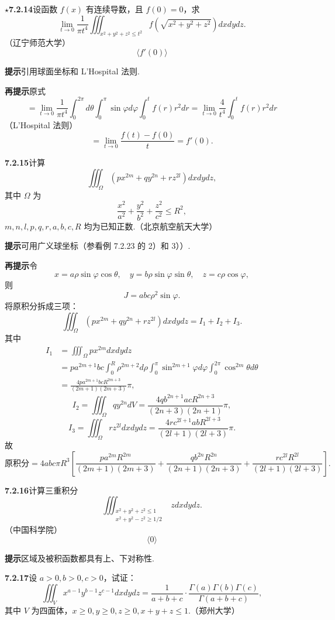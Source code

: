 \documentclass[UTF8,12pt,a4paper,fontset=fandol]{ctexart}
\begin{document}
\noindent\textbf{$\star$7.2.14}\quad 设函数 $f(x)$ 有连续导数，且 $f(0)=0$，求
\[
\lim_{t\to0}\frac1{\pi t^4}
\iiint_{x^2+y^2+z^2\le t^2}
f\left(\sqrt{x^2+y^2+z^2}\right)dxdydz.
\]
（辽宁师范大学）
\[
\langle f'(0)\rangle
\]

\noindent\textbf{提示}\quad 引用球面坐标和 L'Hospital 法则.

\noindent\textbf{再提示}\quad 原式
\[
=\lim_{t\to0}\frac1{\pi t^4}\int_0^{2\pi}d\theta
\int_0^\pi\sin\varphi d\varphi\int_0^tf(r)r^2dr
=\lim_{t\to0}\frac4{t^4}\int_0^tf(r)r^2dr
\]
（L'Hospital 法则）
\[
=\lim_{t\to0}\frac{f(t)-f(0)}t=f'(0).
\]

\noindent\textbf{7.2.15}\quad 计算
\[
\iiint_\Omega(px^{2m}+qy^{2n}+rz^{2l})dxdydz,
\]
其中 $\Omega$ 为
\[
\frac{x^2}{a^2}+\frac{y^2}{b^2}+\frac{z^2}{c^2}\le R^2,
\]
$m,n,l,p,q,r,a,b,c,R$ 均为已知正数.（北京航空航天大学）

\noindent\textbf{提示}\quad 可用广义球坐标（参看例 7.2.23 的 2）和 3））.

\noindent\textbf{再提示}\quad 令
\[
x=a\rho\sin\varphi\cos\theta,\quad
y=b\rho\sin\varphi\sin\theta,\quad
z=c\rho\cos\varphi, \tag{1}
\]
则
\[
J=abc\rho^2\sin\varphi. \tag{2}
\]
将原积分拆成三项：
\[
\iiint_\Omega(px^{2m}+qy^{2n}+rz^{2l})dxdydz=I_1+I_2+I_3.
\]
其中
\[
\begin{aligned}
I_1&=\iiint_\Omega px^{2m}dxdydz\\
&=pa^{2m+1}bc\int_0^R\rho^{2m+2}d\rho
\int_0^\pi\sin^{2m+1}\varphi d\varphi
\int_0^{2\pi}\cos^{2m}\theta d\theta\\
&=\frac{4pa^{2m+1}bcR^{2m+3}}{(2m+1)(2m+3)}\pi,
\end{aligned}
\]
\[
I_2=\iiint_\Omega qy^{2n}dV
=\frac{4qb^{2n+1}acR^{2n+3}}{(2n+3)(2n+1)}\pi,
\]
\[
I_3=\iiint_\Omega rz^{2l}dxdydz
=\frac{4rc^{2l+1}abR^{2l+3}}{(2l+1)(2l+3)}\pi.
\]
故
\[
\text{原积分}=4abc\pi R^3
\left[
\frac{pa^{2m}R^{2m}}{(2m+1)(2m+3)}
+\frac{qb^{2n}R^{2n}}{(2n+1)(2n+3)}
+\frac{rc^{2l}R^{2l}}{(2l+1)(2l+3)}
\right].
\]

\noindent\textbf{7.2.16}\quad 计算三重积分
\[
\iiint_{\substack{x^2+y^2+z^2\le1\\x^2+y^2-z^2\ge1/2}}zdxdydz.
\]
（中国科学院）
\[
\langle0\rangle
\]

\noindent\textbf{提示}\quad 区域及被积函数都具有上、下对称性.

\noindent\textbf{7.2.17}\quad 设 $a>0,b>0,c>0$，试证：
\[
\iiint_V x^{a-1}y^{b-1}z^{c-1}dxdydz
=\frac1{a+b+c}\cdot\frac{\Gamma(a)\Gamma(b)\Gamma(c)}{\Gamma(a+b+c)},
\]
其中 $V$ 为四面体，$x\ge0,y\ge0,z\ge0,x+y+z\le1$.（郑州大学）
\end{document}

